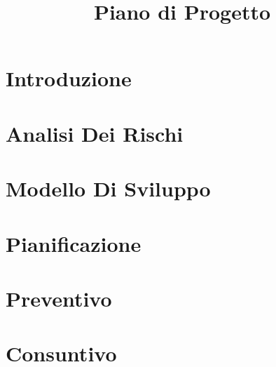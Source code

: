 \documentclass{classes/base}
\title{Piano di Progetto}
\author{\ruth}
\begin{document}
	\maketitle
	\newpage
	
	\tableofcontents
	\newpage
	\listoftables
	\newpage
	\listoffigures
	\newpage

	\section{Introduzione}
	
	
    \newpage
	\section{Analisi Dei Rischi}
	
	\newpage

	\section{Modello Di Sviluppo}
	

	\newpage
	\section{Pianificazione}
	

	\newpage
	\section{Preventivo}
	

	\newpage
	\section{Consuntivo}
	
	
\end{document}
